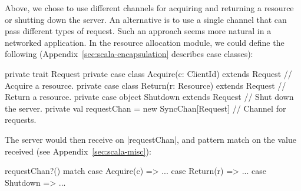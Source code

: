 Above, we chose to use different channels for acquiring and returning a
resource or shutting down the server.  An alternative is to use a single
channel that can pass different types of request.  Such an approach seems more
natural in a networked application.  In the resource allocation module, we
could define the following (Appendix~\ref{sec:scala-encapsulation} describes
case classes):
%
\begin{scala}
  private trait Request
  private case class Acquire(c: ClientId) extends Request // Acquire a resource.
  private case class Return(r: Resource) extends Request // Return a resource.
  private case object Shutdown extends Request // Shut down the server.
  private val requestChan = new SyncChan[Request] // Channel for requests.
\end{scala}
%
The server would then receive on |requestChan|, and pattern match on the value
received (see Appendix~\ref{sec:scala-misc}):
%
\begin{scala}
  requestChan?() match{
    case Acquire(c) => ...
    case Return(r) => ...
    case Shutdown => ...
  }
\end{scala}
